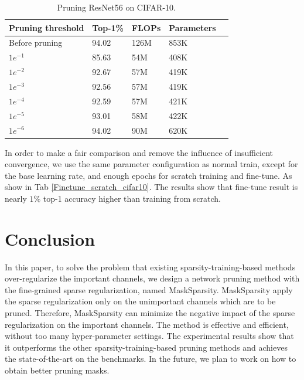 \documentclass[review]{cvpr}
\begin{document}
 
\begin{table}[ht]

	\caption{Pruning ResNet56 on CIFAR-10.}
	\small
	\setlength{\tabcolsep}{0.5em}
	\begin{center}
		\begin{tabular}{lllll}
			\toprule
			Pruning threshold               &Top-1\%           &FLOPs          &Parameters \\
			\midrule
			Before pruning & 94.02      &126M      &853K  \\
			$1e^{-1}$     & 85.63      &54M      &408K  \\
		    $1e^{-2}$     & 92.67      &57M      &419K  \\
		    $1e^{-3}$     & 92.56      &57M      &419K  \\
		    $1e^{-4}$     & 92.59      &57M      &421K  \\
		    $1e^{-5}$     & 93.01      &58M      &422K  \\
		    $1e^{-6}$     & 94.02      &90M      &620K  \\
			\bottomrule
			
		\end{tabular}
	\end{center} 
	\label{pruning_threshold}
\end{table}
 






In order to make a fair comparison and remove the influence of insufficient convergence, we use the same parameter configuration as normal train, except for the base learning rate, and enough epochs for scratch training and fine-tune. As show in Tab \ref{Finetune_scratch_cifar10}. The results show that fine-tune result is nearly  $1\%$ top-1 accuracy  higher than training from scratch.
 


\section{Conclusion}\label{Conclusion}

In this paper, to solve the problem that existing sparsity-training-based methods over-regularize the important channels, we design a network pruning method with the fine-grained sparse regularization, named MaskSparsity. MaskSparsity apply the sparse regularization only on the unimportant channels which are to be pruned. Therefore, MaskSparsity can minimize the negative impact of the sparse regularization on the important channels. The method is effective and efficient, without too many hyper-parameter settings. The experimental results show that it outperforms the other sparsity-training-based pruning methods and achieves the state-of-the-art on the benchmarks. In the future, we plan to work on how to obtain better pruning masks.


{\small


}
\end{document}
